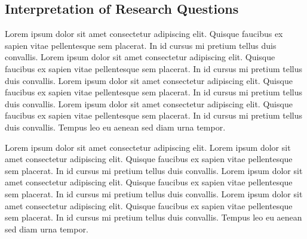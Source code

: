 \documentclass[sigconf,nonacm]{acmart} %
\begin{document}
\subsection{Interpretation of Research Questions}
\label{subsec:interpretations}

Lorem ipsum dolor sit amet consectetur adipiscing elit. Quisque faucibus ex sapien vitae pellentesque sem placerat. In id cursus mi pretium tellus duis convallis.
Lorem ipsum dolor sit amet consectetur adipiscing elit. Quisque faucibus ex sapien vitae pellentesque sem placerat. In id cursus mi pretium tellus duis convallis.
Lorem ipsum dolor sit amet consectetur adipiscing elit. Quisque faucibus ex sapien vitae pellentesque sem placerat. In id cursus mi pretium tellus duis convallis.
Lorem ipsum dolor sit amet consectetur adipiscing elit. Quisque faucibus ex sapien vitae pellentesque sem placerat. In id cursus mi pretium tellus duis convallis. Tempus leo eu aenean sed diam urna tempor.

Lorem ipsum dolor sit amet consectetur adipiscing elit.
Lorem ipsum dolor sit amet consectetur adipiscing elit. Quisque faucibus ex sapien vitae pellentesque sem placerat. In id cursus mi pretium tellus duis convallis.
Lorem ipsum dolor sit amet consectetur adipiscing elit. Quisque faucibus ex sapien vitae pellentesque sem placerat. In id cursus mi pretium tellus duis convallis.
Lorem ipsum dolor sit amet consectetur adipiscing elit. Quisque faucibus ex sapien vitae pellentesque sem placerat. In id cursus mi pretium tellus duis convallis. Tempus leo eu aenean sed diam urna tempor.
\end{document}
